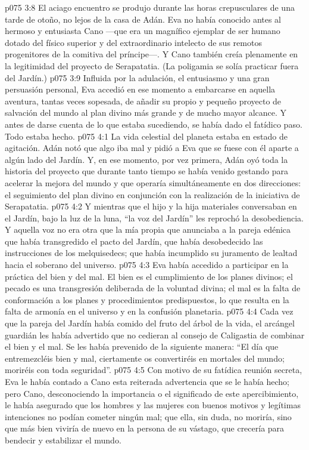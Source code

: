 \vs p075 3:8 El aciago encuentro se produjo durante las horas crepusculares de una tarde de otoño, no lejos de la casa de Adán. Eva no había conocido antes al hermoso y entusiasta Cano ---que era un magnífico ejemplar de ser humano dotado del físico superior y del extraordinario intelecto de sus remotos progenitores de la comitiva del príncipe---. Y Cano también creía plenamente en la legitimidad del proyecto de Serapatatia. (La poligamia se solía practicar fuera del Jardín.)
\vs p075 3:9 Influida por la adulación, el entusiasmo y una gran persuasión personal, Eva accedió en ese momento a embarcarse en aquella aventura, tantas veces sopesada, de añadir su propio y pequeño proyecto de salvación del mundo al plan divino más grande y de mucho mayor alcance. Y antes de darse cuenta de lo que estaba sucediendo, se había dado el fatídico paso. Todo estaba hecho.
\vs p075 4:1 La vida celestial del planeta estaba en estado de agitación. Adán notó que algo iba mal y pidió a Eva que se fuese con él aparte a algún lado del Jardín. Y, en ese momento, por vez primera, Adán oyó toda la historia del proyecto que durante tanto tiempo se había venido gestando para acelerar la mejora del mundo y que operaría simultáneamente en dos direcciones: el seguimiento del plan divino en conjunción con la realización de la iniciativa de Serapatatia.
\vs p075 4:2 Y mientras que el hijo y la hija materiales conversaban en el Jardín, bajo la luz de la luna, “la voz del Jardín” les reprochó la desobediencia. Y aquella voz no era otra que la mía propia que anunciaba a la pareja edénica que había transgredido el pacto del Jardín, que había desobedecido las instrucciones de los melquisedecs; que había incumplido su juramento de lealtad hacia el soberano del universo.
\vs p075 4:3 Eva había accedido a participar en la práctica del bien y del mal. El bien es el cumplimiento de los planes divinos; el pecado es una transgresión deliberada de la voluntad divina; el mal es la falta de conformación a los planes y procedimientos predispuestos, lo que resulta en la falta de armonía en el universo y en la confusión planetaria.
\vs p075 4:4 Cada vez que la pareja del Jardín había comido del fruto del árbol de la vida, el arcángel guardián les había advertido que no cedieran al consejo de Caligastia de combinar el bien y el mal. Se les había prevenido de la siguiente manera: “El día que entremezcléis bien y mal, ciertamente os convertiréis en mortales del mundo; moriréis con toda seguridad”.
\vs p075 4:5 Con motivo de su fatídica reunión secreta, Eva le había contado a Cano esta reiterada advertencia que se le había hecho; pero Cano, desconociendo la importancia o el significado de este apercibimiento, le había asegurado que los hombres y las mujeres con buenos motivos y legítimas intenciones no podían cometer ningún mal; que ella, sin duda, no moriría, sino que más bien viviría de nuevo en la persona de su vástago, que crecería para bendecir y estabilizar el mundo.
